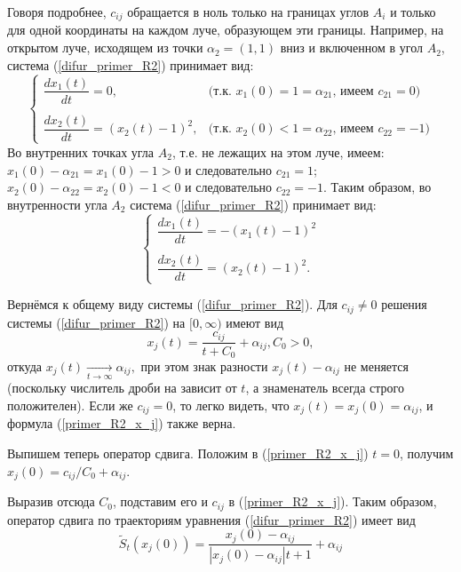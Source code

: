 Говоря подробнее,
$c_{ij}$ обращается в ноль только на границах углов $A_i$ и только для одной координаты на каждом луче,
образующем эти границы.
Например, на открытом луче, исходящем из точки $\alpha_2=(1, 1)$ вниз и включенном в угол $A_2$, система (\ref{difur_primer_R2})
принимает вид:
\begin{equation*}
	\begin{cases}
		\dfrac{dx_1(t)}{dt} = 0, &\mbox{(т.к. $x_1(0) = 1 = \alpha_{21}$, имеем $c_{21} = 0$)}
	\\\\
		\dfrac{dx_2(t)}{dt} =  (x_2(t)-1)^2,  &\mbox{(т.к. $x_2(0) < 1 = \alpha_{22}$, имеем $c_{22} = -1$)}
	\end{cases}
\end{equation*}
Во внутренних точках угла $A_2$, т.е. не лежащих на этом луче, имеем:
$x_1(0) - \alpha_{21} = x_1(0) - 1 > 0$ и следовательно $c_{21} = 1$;
$x_2(0) - \alpha_{22} = x_2(0) - 1 < 0$ и следовательно $c_{22} = -1$.
Таким образом, во внутренности угла $A_2$ система (\ref{difur_primer_R2})
принимает вид:
\begin{equation*}
	\begin{cases}
		\dfrac{dx_1(t)}{dt} =  - (x_1(t)-1)^2
	\\\\
		\dfrac{dx_2(t)}{dt} =  (x_2(t)-1)^2.
	\end{cases}
\end{equation*}

Вернёмся к общему виду системы (\ref{difur_primer_R2}).
Для $c_{ij} \neq 0$ решения системы (\ref{difur_primer_R2}) на $[0, \infty)$ имеют вид
\begin{equation}\label{primer_R2_x_j}
	x_j(t) = \frac{c_{ij}}{t+C_0}+\alpha_{ij}, C_0 > 0,
\end{equation}
откуда
$
	x_j(t) \xrightarrow[t\to \infty ]{}{\alpha_{ij}},
$
при этом знак разности $x_j(t) - \alpha_{ij}$ не меняется (поскольку числитель дроби на зависит от $t$, а знаменатель всегда строго положителен).
Если же $c_{ij}=0$, то легко видеть, что $x_j(t) = x_j(0) = \alpha_{ij}$,
и формула (\ref{primer_R2_x_j}) также верна.

Выпишем теперь оператор сдвига.
Положим в (\ref{primer_R2_x_j}) $t=0$, получим
$
	x_j(0) = c_{ij}/{C_0}+\alpha_{ij}
$.

Выразив отсюда $C_0$, подставим его и $c_{ij}$ в (\ref{primer_R2_x_j}).
Таким образом, оператор сдвига по траекториям уравнения (\ref{difur_primer_R2}) имеет вид
\begin{equation}\label{primer_R2_oper_sdviga}
	\tilde{S}_t(x_{j}(0)) = \frac{x_{j}(0)-\alpha_{ij}}{|x_{j}(0)-\alpha_{ij}|t+1}+\alpha_{ij}
\end{equation}

